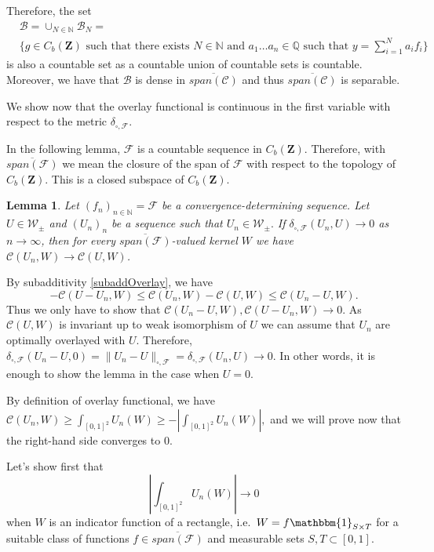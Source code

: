 \documentclass[11pt]{article}
\newtheorem{lemma}[theorem]{Lemma}
\def\N{\mathbb{N}}
\def\Q{\mathbb{Q}}
\newcommand{\cB}{{\mathcal B}}  %
\newcommand{\cC}{{\mathcal C}}  %
\newcommand{\cF}{{\mathcal F}}  %
\newcommand{\Space}{\mathbf{Z}}
\newcommand{\signed}{\pm}
\newcommand{\CbFunct}{C_b(\Space)}
\newcommand{\Kernel}{\mathcal{W}_{\signed}}
\begin{document}
Therefore, the set \begin{equation}\label{eq:CountabSet}\begin{aligned}
&\cB=\cup_{N\in \N}\cB_N=\\
&\{g\in  \CbFunct \text{ such that there exists } N\in\N \text{ and }a_1\ldots a_n\in \Q \text{ such that } y=\sum^N_{i=1}a_if_i\}\end{aligned}\end{equation} is also a countable set as a countable union of countable sets is countable.
Moreover, we have that $\cB$ is dense in $\overline{span(\cC)}$ and thus $\overline{span(\cC)}$ is separable.
\endproof

We show now that the overlay functional is continuous in the first variable with respect to the metric $\delta_{\square,\cF}.$

In the following lemma, $\cF$ is a countable sequence in $\CbFunct$. Therefore, with $\overline{span(\cF)}$ we mean the closure of the span of $\cF$ with respect to the topology of $\CbFunct$. This is a closed subspace of $\CbFunct.$

\begin{lemma}\label{LemmmetricConvImpliesOverlay}
Let $(f_{n})_{n\in \N}=\cF$ be a convergence-determining sequence. Let $U \in \Kernel$ and $(U_n)_n$ be a sequence such that $U_n\in \Kernel.$ If $\delta_{\square,\cF}\left(U_n, U\right) \rightarrow 0$ as $n \rightarrow \infty$, then for every $\overline{span(\cF)}$-valued kernel $W$ we have $\mathcal{C}\left(U_n, W\right) \rightarrow \mathcal{C}(U, W)$.
\end{lemma}
\proof
By subadditivity \eqref{subaddOverlay}, we have
$$
 -\mathcal{C}\left(U-U_n, W\right) \leq \mathcal{C}\left(U_n, W\right)-\mathcal{C}(U, W) \leq \mathcal{C}\left(U_n-U, W\right).
$$
Thus we only have to show that $\mathcal{C}\left(U_n-U, W\right), \mathcal{C}\left(U-U_n, W\right) \rightarrow 0$.
As $\cC(U,W)$ is invariant up to weak isomorphism of $U$ we can assume that $U_n$ are optimally overlayed with $U$. Therefore, $\delta_{\square,\cF}\left(U_n-U,0\right)=\|U_n-U\|_{\square,\cF}=\delta_{\square,\cF}\left(U_n, U\right)\rightarrow 0.$
In other words, it is enough to show the lemma in the case when $U=0$.

By definition of overlay functional, we have $\mathcal{C}(U_n,W)\geq \int_{[0,1]^{2}}U_n(W)\geq -\left|\int_{[0,1]^{2}}U_n(W)\right|,$ and we will prove now that the right-hand side converges to 0. 

Let's show first that $$
\left|\int_{[0,1]^{2}}U_n(W)\right|\rightarrow 0
$$
when $W$ is an indicator function of a rectangle, i.e.\ $W=f\mathbbm{1}_{S\times T}$ for a suitable class of functions $f\in \overline{span(\cF)}$ and measurable sets $S,T\subset [0,1].$ 
\end{document}
